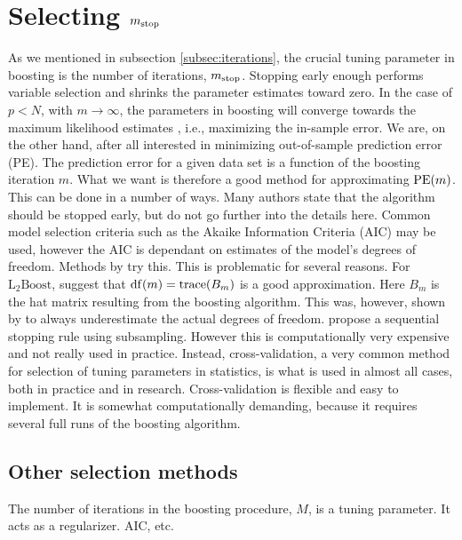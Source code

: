 \section{Selecting $m_{\text{stop}}$}
As we mentioned in subsection \ref{subsec:iterations}, the crucial tuning parameter in boosting is the number of iterations, $m_{\text{stop}}$. Stopping early enough performs variable selection and shrinks the parameter estimates toward zero. In the case of $p<N$, with $m\to\infty$, the parameters in boosting will converge towards the maximum likelihood estimates \citep{DeBin2016}, i.e., maximizing the in-sample error. We are, on the other hand, after all interested in minimizing out-of-sample prediction error (PE). The prediction error for a given data set is a function of the boosting iteration $m$. What we want is therefore a good method for approximating $\operatorname{PE}(m)$. This can be done in a number of ways. Many authors state that the algorithm should be stopped early, but do not go further into the details here. Common model selection criteria such as the Akaike Information Criteria (AIC) may be used, however the AIC is dependant on estimates of the model's degrees of freedom. Methods by \citet{chang2010} try this. This is problematic for several reasons. For $\text{L}_2\text{Boost}$, \citet{buhlmann2007} suggest that $\operatorname{df}(m)=\operatorname{trace}(B_m)$ is a good approximation. Here $B_m$ is the hat matrix resulting from the boosting algorithm. This was, however, shown by \citet{hastie2007} to always underestimate the actual degrees of freedom. \citet{mayr-hofner} propose a sequential stopping rule using subsampling. However this is computationally very expensive and not really used in practice. Instead, cross-validation, a very common method for selection of tuning parameters in statistics, is what is used in almost all cases, both in practice and in research. Cross-validation is flexible and easy to implement. It is somewhat computationally demanding, because it requires several full runs of the boosting algorithm.

\subsection{Other selection methods}
The number of iterations in the boosting procedure, $M$, is a tuning parameter. It acts as a regularizer. AIC, etc.

